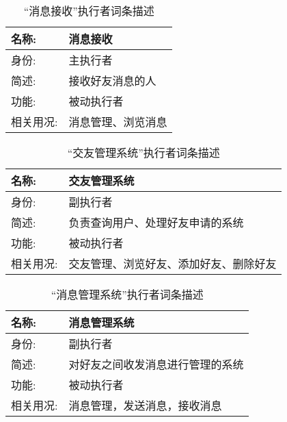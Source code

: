 \begin{table}[H]  
\caption{“消息接收”执行者词条描述}  
\begin{center}  
    \begin{tabular}{l p{11cm}} 
        \hline
        \quad 名称:  &   消息接收 \\
        \hline
        \quad 身份:  & 主执行者 \\
        \hline
        \quad 简述:  & 接收好友消息的人 \\
        \hline
        \quad 功能:  & 被动执行者 \\
        \hline
        \quad 相关用况:  & 消息管理、浏览消息 \\
        \hline
    \end{tabular}
\end{center}
\end{table}

\begin{table}[H]  
\caption{“交友管理系统”执行者词条描述}  
\begin{center}  
    \begin{tabular}{l p{11cm}} 
        \hline
        \quad 名称:  &  交友管理系统 \\
        \hline
        \quad 身份:  & 副执行者 \\
        \hline
        \quad 简述:  & 负责查询用户、处理好友申请的系统 \\
        \hline
        \quad 功能:  & 被动执行者 \\
        \hline
        \quad 相关用况:  & 交友管理、浏览好友、添加好友、删除好友 \\
        \hline
    \end{tabular}
\end{center}
\end{table}

\begin{table}[H]  
\caption{“消息管理系统”执行者词条描述}  
\begin{center}  
    \begin{tabular}{l p{11cm}} 
        \hline
        \quad 名称:  &  消息管理系统 \\
        \hline
        \quad 身份:  & 副执行者 \\
        \hline
        \quad 简述:  & 对好友之间收发消息进行管理的系统 \\
        \hline
        \quad 功能:  & 被动执行者 \\
        \hline
        \quad 相关用况:  & 消息管理，发送消息，接收消息 \\
        \hline
    \end{tabular}
\end{center}
\end{table}